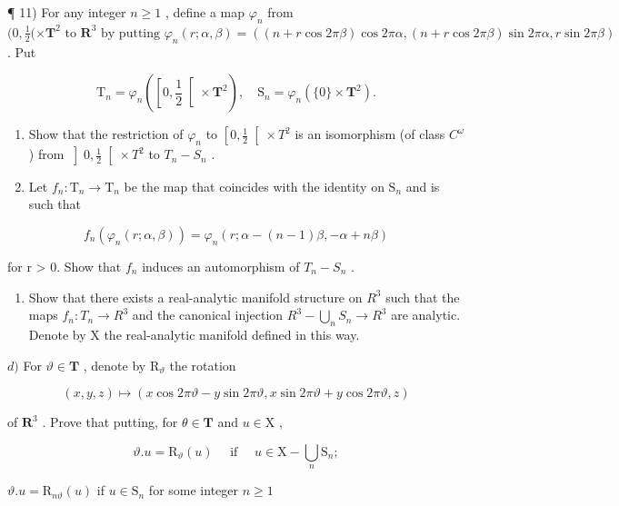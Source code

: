 ¶ 11) For any integer \(n \geq 1\) , define a map \(\varphi_n\) from \((0, \frac{1}{2} (\times \mathbf{T}^2 \text{ to } \mathbf{R}^3 \text{ by putting } \varphi_n(r; \alpha, \beta) = ((n + r \cos 2\pi\beta) \cos 2\pi\alpha, (n + r \cos 2\pi\beta) \sin 2\pi\alpha, r \sin 2\pi\beta)\) . Put

\[
\mathrm{T} _ {n} = \varphi_ {n} \left(\left[ 0, \frac {1}{2} \right[ \times \mathbf {T} ^ {2}\right), \quad \mathrm{S} _ {n} = \varphi_ {n} (\{0 \} \times \mathbf {T} ^ {2}).
\]

\begin{enumerate}
\def\labelenumi{\alph{enumi})}
\item
  Show that the restriction of \(\varphi_{n}\) to \(\left[0,\frac{1}{2}\right[\times T^{2}\) is an isomorphism (of class \(C^{\omega}\) ) from \(\left]0,\frac{1}{2}\right[\times T^{2}\) to \(T_{n}-S_{n}\) .
\item
  Let \(f_{n}:\mathrm{T}_{n}\to \mathrm{T}_{n}\) be the map that coincides with the identity on \(\mathrm{S}_n\) and is such that
\end{enumerate}

\[
f _ {n} (\varphi_ {n} (r; \alpha , \beta)) = \varphi_ {n} (r; \alpha - (n - 1) \beta , - \alpha + n \beta)
\]

for r \textgreater{} 0. Show that \(f_{n}\) induces an automorphism of \(T_{n} - S_{n}\) .

\begin{enumerate}
\def\labelenumi{\alph{enumi})}
\setcounter{enumi}{2}
\tightlist
\item
  Show that there exists a real-analytic manifold structure on \(R^{3}\) such that the maps \(f_{n}: T_{n} \to R^{3}\) and the canonical injection \(R^{3}-\bigcup_{n} S_{n} \to R^{3}\) are analytic. Denote by X the real-analytic manifold defined in this way.
\end{enumerate}

\(d)\) For \(\vartheta \in \mathbf{T}\) , denote by \(\mathrm{R}_{\vartheta}\) the rotation

\[
(x, y, z) \mapsto (x \cos 2 \pi \vartheta - y \sin 2 \pi \vartheta , x \sin 2 \pi \vartheta + y \cos 2 \pi \vartheta , z)
\]

of \(\mathbf{R}^3\) . Prove that putting, for \(\theta \in \mathbf{T}\) and \(u \in \mathrm{X}\) ,

\[
\vartheta . u = \mathrm{R} _ {\vartheta} (u) \quad \text { if } \quad u \in \mathrm{X} - \bigcup_ {n} \mathrm{S} _ {n};
\]

\(\vartheta .u = \mathrm{R}_{n\vartheta}(u)\) if \(u\in \mathrm{S}_n\) for some integer \(n\geq 1\)

